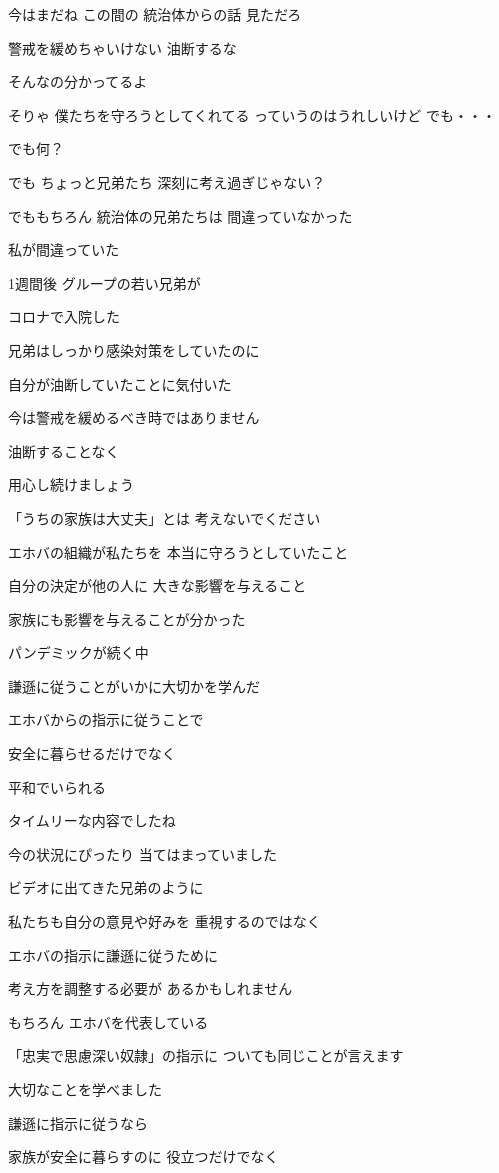 \documentclass[twocolumn]{jsarticle}
\begin{document}
今はまだね この間の
統治体からの話 見ただろ

警戒を緩めちゃいけない 油断するな

そんなの分かってるよ

そりゃ 僕たちを守ろうとしてくれてる
っていうのはうれしいけど でも・・・

でも何？

でも ちょっと兄弟たち
深刻に考え過ぎじゃない？

でももちろん 統治体の兄弟たちは
間違っていなかった

私が間違っていた

1週間後 グループの若い兄弟が

コロナで入院した

兄弟はしっかり感染対策をしていたのに

自分が油断していたことに気付いた

今は警戒を緩めるべき時ではありません

油断することなく

用心し続けましょう

「うちの家族は大丈夫」とは
考えないでください

エホバの組織が私たちを
本当に守ろうとしていたこと

自分の決定が他の人に
大きな影響を与えること

家族にも影響を与えることが分かった

パンデミックが続く中

謙遜に従うことがいかに大切かを学んだ

エホバからの指示に従うことで

安全に暮らせるだけでなく

平和でいられる

タイムリーな内容でしたね

今の状況にぴったり
当てはまっていました

ビデオに出てきた兄弟のように

私たちも自分の意見や好みを
重視するのではなく

エホバの指示に謙遜に従うために

考え方を調整する必要が
あるかもしれません

もちろん エホバを代表している

「忠実で思慮深い奴隷」の指示に
ついても同じことが言えます

大切なことを学べました

謙遜に指示に従うなら

家族が安全に暮らすのに
役立つだけでなく
\end{document}
